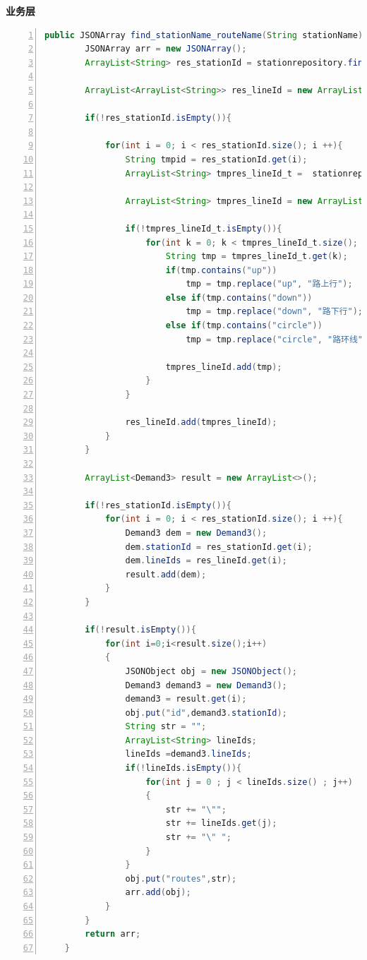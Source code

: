 \documentclass[11pt,a4paper]{article}
\begin{document}
\textbf{业务层} \\
\begin{lstlisting}[numbers = left, 
showstringspaces=false,
showspaces = false,
breaklines = true, 
language=Java]
    public JSONArray find_stationName_routeName(String stationName){
        JSONArray arr = new JSONArray();
        ArrayList<String> res_stationId = stationrepository.find_stationName_routeName_stationId(stationName);

        ArrayList<ArrayList<String>> res_lineId = new ArrayList<>();

        if(!res_stationId.isEmpty()){

            for(int i = 0; i < res_stationId.size(); i ++){
                String tmpid = res_stationId.get(i);
                ArrayList<String> tmpres_lineId_t =  stationrepository.find_stationName_routeName_lineId(tmpid);

                ArrayList<String> tmpres_lineId = new ArrayList<>();

                if(!tmpres_lineId_t.isEmpty()){
                    for(int k = 0; k < tmpres_lineId_t.size(); k ++){
                        String tmp = tmpres_lineId_t.get(k);
                        if(tmp.contains("up"))
                            tmp = tmp.replace("up", "路上行");
                        else if(tmp.contains("down"))
                            tmp = tmp.replace("down", "路下行");
                        else if(tmp.contains("circle"))
                            tmp = tmp.replace("circle", "路环线");

                        tmpres_lineId.add(tmp);
                    }
                }

                res_lineId.add(tmpres_lineId);
            }
        }

        ArrayList<Demand3> result = new ArrayList<>();

        if(!res_stationId.isEmpty()){
            for(int i = 0; i < res_stationId.size(); i ++){
                Demand3 dem = new Demand3();
                dem.stationId = res_stationId.get(i);
                dem.lineIds = res_lineId.get(i);
                result.add(dem);
            }
        }

        if(!result.isEmpty()){
            for(int i=0;i<result.size();i++)
            {
                JSONObject obj = new JSONObject();
                Demand3 demand3 = new Demand3();
                demand3 = result.get(i);
                obj.put("id",demand3.stationId);
                String str = "";
                ArrayList<String> lineIds;
                lineIds =demand3.lineIds;
                if(!lineIds.isEmpty()){
                    for(int j = 0 ; j < lineIds.size() ; j++)
                    {
                        str += "\"";
                        str += lineIds.get(j);
                        str += "\" ";
                    }
                }
                obj.put("routes",str);
                arr.add(obj);
            }
        }
        return arr;
    }
\end{lstlisting} 
\end{document}
